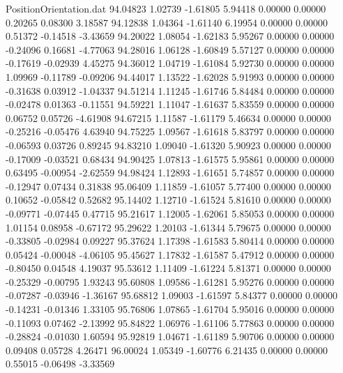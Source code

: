 \begin{filecontents}{PositionOrientation.dat}
  94.04823    1.02739   -1.61805     5.94418    0.00000    0.00000    0.20265    0.08300    3.18587
  94.12838    1.04364   -1.61140     6.19954    0.00000    0.00000    0.51372   -0.14518   -3.43659
  94.20022    1.08054   -1.62183     5.95267    0.00000    0.00000   -0.24096    0.16681   -4.77063
  94.28016    1.06128   -1.60849     5.57127    0.00000    0.00000   -0.17619   -0.02939    4.45275
  94.36012    1.04719   -1.61084     5.92730    0.00000    0.00000    1.09969   -0.11789   -0.09206
  94.44017    1.13522   -1.62028     5.91993    0.00000    0.00000   -0.31638    0.03912   -1.04337
  94.51214    1.11245   -1.61746     5.84484    0.00000    0.00000   -0.02478    0.01363   -0.11551
  94.59221    1.11047   -1.61637     5.83559    0.00000    0.00000    0.06752    0.05726   -4.61908
  94.67215    1.11587   -1.61179     5.46634    0.00000    0.00000   -0.25216   -0.05476    4.63940
  94.75225    1.09567   -1.61618     5.83797    0.00000    0.00000   -0.06593    0.03726    0.89245
  94.83210    1.09040   -1.61320     5.90923    0.00000    0.00000   -0.17009   -0.03521    0.68434
  94.90425    1.07813   -1.61575     5.95861    0.00000    0.00000    0.63495   -0.00954   -2.62559
  94.98424    1.12893   -1.61651     5.74857    0.00000    0.00000   -0.12947    0.07434    0.31838
  95.06409    1.11859   -1.61057     5.77400    0.00000    0.00000    0.10652   -0.05842    0.52682
  95.14402    1.12710   -1.61524     5.81610    0.00000    0.00000   -0.09771   -0.07445    0.47715
  95.21617    1.12005   -1.62061     5.85053    0.00000    0.00000    1.01154    0.08958   -0.67172
  95.29622    1.20103   -1.61344     5.79675    0.00000    0.00000   -0.33805   -0.02984    0.09227
  95.37624    1.17398   -1.61583     5.80414    0.00000    0.00000    0.05424   -0.00048   -4.06105
  95.45627    1.17832   -1.61587     5.47912    0.00000    0.00000   -0.80450    0.04548    4.19037
  95.53612    1.11409   -1.61224     5.81371    0.00000    0.00000   -0.25329   -0.00795    1.93243
  95.60808    1.09586   -1.61281     5.95276    0.00000    0.00000   -0.07287   -0.03946   -1.36167
  95.68812    1.09003   -1.61597     5.84377    0.00000    0.00000   -0.14231   -0.01346    1.33105
  95.76806    1.07865   -1.61704     5.95016    0.00000    0.00000   -0.11093    0.07462   -2.13992
  95.84822    1.06976   -1.61106     5.77863    0.00000    0.00000   -0.28824   -0.01030    1.60594
  95.92819    1.04671   -1.61189     5.90706    0.00000    0.00000    0.09408    0.05728    4.26471
  96.00024    1.05349   -1.60776     6.21435    0.00000    0.00000    0.55015   -0.06498   -3.33569

\end{filecontents}
